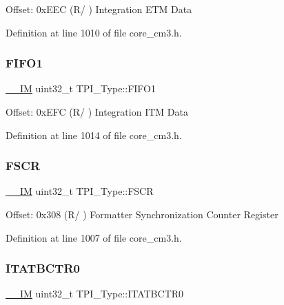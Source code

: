 Offset\+: 0x\+E\+EC (R/ ) Integration E\+TM Data 

Definition at line 1010 of file core\+\_\+cm3.\+h.

\mbox{\label{struct_t_p_i___type_a061372fcd72f1eea871e2d9c1be849bc}} 
\subsubsection{\texorpdfstring{F\+I\+F\+O1}{FIFO1}}
{\footnotesize\ttfamily \hyperlink{core__sc300_8h_a4cc1649793116d7c2d8afce7a4ffce43}{\+\_\+\+\_\+\+IM} uint32\+\_\+t T\+P\+I\+\_\+\+Type\+::\+F\+I\+F\+O1}

Offset\+: 0x\+E\+FC (R/ ) Integration I\+TM Data 

Definition at line 1014 of file core\+\_\+cm3.\+h.

\mbox{\label{struct_t_p_i___type_ad6901bfd8a0089ca7e8a20475cf494a8}} 
\subsubsection{\texorpdfstring{F\+S\+CR}{FSCR}}
{\footnotesize\ttfamily \hyperlink{core__sc300_8h_a4cc1649793116d7c2d8afce7a4ffce43}{\+\_\+\+\_\+\+IM} uint32\+\_\+t T\+P\+I\+\_\+\+Type\+::\+F\+S\+CR}

Offset\+: 0x308 (R/ ) Formatter Synchronization Counter Register 

Definition at line 1007 of file core\+\_\+cm3.\+h.

\mbox{\label{struct_t_p_i___type_aaa573b2e073e76e93c51ecec79c616d0}} 
\subsubsection{\texorpdfstring{I\+T\+A\+T\+B\+C\+T\+R0}{ITATBCTR0}}
{\footnotesize\ttfamily \hyperlink{core__sc300_8h_a4cc1649793116d7c2d8afce7a4ffce43}{\+\_\+\+\_\+\+IM} uint32\+\_\+t T\+P\+I\+\_\+\+Type\+::\+I\+T\+A\+T\+B\+C\+T\+R0}

